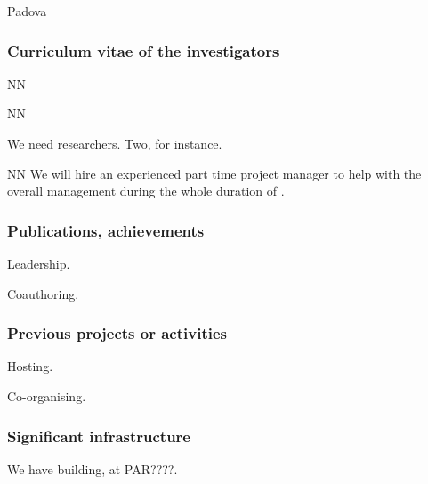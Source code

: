 \begin{sitedescription}{Padova}
\subsubsection*{Curriculum vitae of the investigators}




\begin{participant}[type=res,PM=48,salary=2500]{NN}
\end{participant}
\begin{participant}[type=res,PM=36,salary=2500]{NN}

We need researchers. Two, for instance.

\end{participant}

\begin{participant}[type=res,PM=24,salary=3932]{NN}
  We will hire an experienced part time project manager to help with
  the overall management during the whole duration of \TheProject.
\end{participant}

\subsubsection*{Publications, achievements}

\begin{compactenum}
\item Leadership.
\item Coauthoring.
\end{compactenum}


\subsubsection*{Previous projects or activities}

\begin{compactenum}
\item Hosting.
\item Co-organising.
\end{compactenum}

\subsubsection*{Significant infrastructure}

We have building, at PAR????.

\end{sitedescription}




